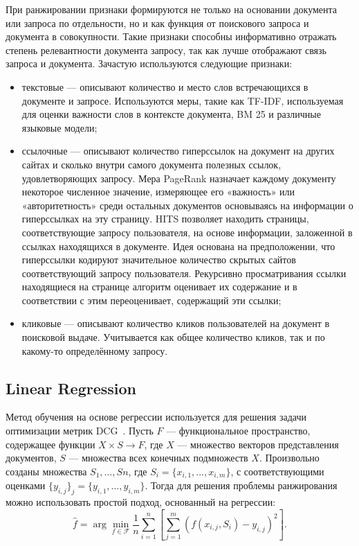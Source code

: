 При ранжировании признаки формируются не только на основании документа или запроса по отдельности, но и как функция от поискового запроса и документа в совокупности. Такие признаки способны информативно отражать степень релевантности документа запросу, так как лучше отображают связь запроса и документа.
Зачастую используются следующие признаки:
\begin{itemize}[label=---]
	\item текстовые --- описывают количество и место слов встречающихся в документе и запросе. Используются меры, такие как TF-IDF, используемая для оценки важности слов в контексте документа, BM 25 и различные языковые модели;
	\item ссылочные --- описывают количество гиперссылок на документ на других сайтах и сколько внутри самого документа полезных ссылок, удовлетворяющих запросу. Мера PageRank назначает каждому документу некоторое численное значение, измеряющее его «важность» или «авторитетность» среди остальных документов основываясь на информации о гиперссылках на эту страницу.   HITS позволяет находить страницы, соответствующие запросу пользователя, на основе информации, заложенной в ссылках находящихся в документе. Идея основана на предположении, что гиперссылки кодируют значительное количество скрытых сайтов соответствующий запросу пользователя. Рекурсивно просматривания ссылки находящиеся на странице алгоритм оценивает их содержание и в соответствии с этим переоценивает, содержащий эти ссылки;
	\item кликовые --- описывают количество кликов пользователей на документ в поисковой выдаче. Учитывается как общее количество кликов, так и по какому-то определённому запросу.
\end{itemize}

\subsection{Linear Regression}

 Метод обучения на основе регрессии используется для решения задачи оптимизации метрик DCG~\cite{LR}. Пусть $F$ --- функциональное пространство, содержащее функции $X \times S \to F$, где $X$ --- множество векторов представления документов, $S$ --- множества всех конечных подмножеств $X$. Произвольно созданы множества $S_{1}, \dots, S{n}$, где $S_{i} = \{x_{i,1}, \dots, x_{i,m}\}$, с соответствующими оценками $\{y_{i,j}\}_{j} = \{y_{i,1}, \dots, y_{i,m}\}$. Тогда для решения проблемы ранжирования можно использовать простой подход, основанный на регрессии:
\begin{equation}
	\label{eq:LR1}
	\hat{f}=\arg \min _{f \in \mathcal{F}} \frac{1}{n} \sum_{i=1}^n[\sum_{j=1}^m(f(x_{i, j}, S_i)-y_{i, j})^2].
\end{equation}

